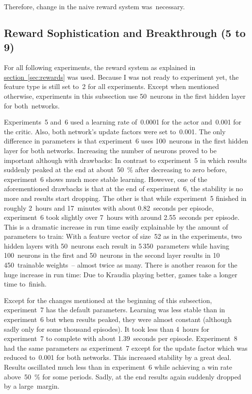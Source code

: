 \documentclass[a4paper,titlepage]{article}
\begin{document}
Therefore, change in the naive reward system was~necessary.

\subsection{Reward Sophistication and Breakthrough (5 to 9)}

For all following experiments, the reward system as explained in \hyperref[sec:rewards]{section~\ref*{sec:rewards}} was used. Because I was not ready to experiment yet, the feature type is still set to~2 for all experiments. Except when mentioned otherwise, experiments in this subsection use 50~neurons in the first hidden layer for both~networks.

Experiments~5 and~6 used a learning rate of~0.0001 for the actor and~0.001 for the critic. Also, both network's update factors were set to~0.001. The only difference in parameters is that experiment~6 uses 100~neurons in the first hidden layer for both networks.
Increasing the number of neurons proved to be important although with drawbacks: In contrast to experiment~5 in which results suddenly peaked at the end at about~50~\% after decreasing to zero before, experiment~6 shows much more stable learning. However, one of the aforementioned drawbacks is that at the end of experiment~6, the stability is no more and results start dropping. The other is that while experiment~5 finished in roughly 2~hours and 17~minutes with about 0.82~seconds per episode, experiment~6 took slightly over 7~hours with around 2.55~seconds per episode. This is a dramatic increase in run time easily explainable by the amount of parameters to train: With a feature vector of size~52 as in the experiments, two hidden layers with 50~neurons each result in 5\,350~parameters while having 100~neurons in the first and 50~neurons in the second layer results in 10\,450~trainable weights~--  almost twice as many. There is another reason for the huge increase in run time: Due to Kraudia playing better, games take a longer time to~finish.

Except for the changes mentioned at the beginning of this subsection, experiment~7 has the default parameters. Learning was less stable than in experiment~6 but when results peaked, they were almost constant (although sadly only for some thousand episodes). It took less than 4~hours for experiment~7 to complete with about 1.39~seconds per episode. Experiment~8 had the same parameters as experiment~7 except for the update factor which was reduced to~0.001 for both networks. This increased stability by a great deal. Results oscillated much less than in experiment~6 while achieving a win rate above~50~\% for some periods. Sadly, at the end results again suddenly dropped by a large~margin.
\end{document}
